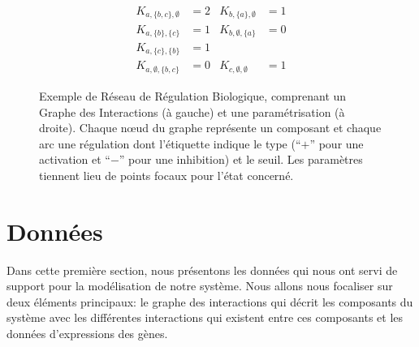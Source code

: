 \begin{figure}[h]
\begin{minipage}{0.4\linewidth}
\centering
{}
\end{minipage}
\begin{minipage}{0.6\linewidth}
\centering
\begin{align*}
K_{a,\{b,c\},\emptyset} &= 2 & K_{b,\{a\},\emptyset} &= 1 \\
K_{a,\{b\},\{c\}} &= 1 & K_{b,\emptyset,\{a\}} &= 0 \\
K_{a,\{c\},\{b\}} &= 1 &&\\
K_{a,\emptyset,\{b,c\}} &= 0 & K_{c,\emptyset,\emptyset} &= 1
\end{align*}
\end{minipage}
\caption{\label{fig:exRRB}
Exemple de Réseau de Régulation Biologique, comprenant un Graphe des Interactions (à gauche) et une paramétrisation (à droite).
Chaque nœud du graphe représente un composant et chaque arc une régulation
dont l'étiquette indique le type (“$+$” pour une activation et “$-$” pour une inhibition) et le seuil.
Les paramètres tiennent lieu de points focaux pour l'état concerné.
}
\end{figure}


\section{Données}

Dans cette première section, nous présentons les données qui nous ont servi de support pour la modélisation de notre système. 
Nous allons nous focaliser sur deux éléments principaux: le graphe des interactions qui décrit les composants du système avec 
les différentes interactions qui existent entre ces composants et les données d'expressions des gènes. 


